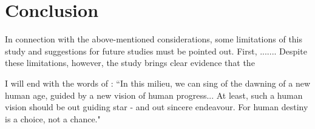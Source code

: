 \chapter{Conclusion}

In connection with the above-mentioned considerations, some limitations of this study and suggestions for future studies must be pointed out. First, ....... Despite these limitations, however, the study brings clear evidence that the 


I will end with the words of  \citet[][p204]{Haq1996}: “In this milieu, we can sing of the dawning of a new human age, guided by a new vision of human progress... At least, such a human vision should be out guiding star - and out sincere endeavour. For human destiny is a choice, not a chance."